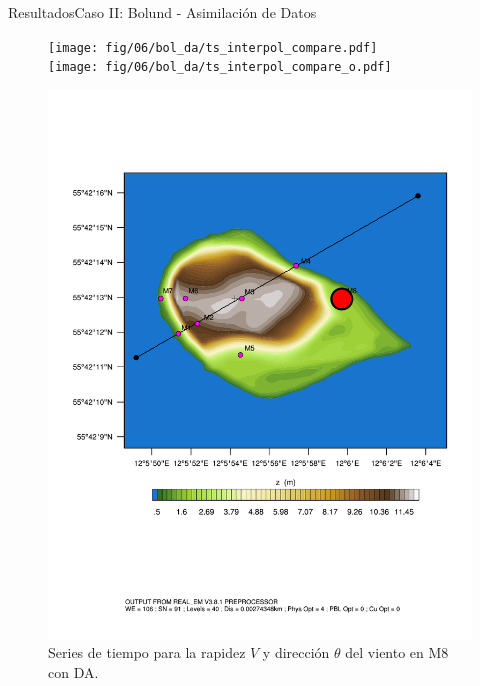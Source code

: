 \documentclass[mathserif,10pt]{beamer}
\begin{document}
\begin{frame}{Resultados}{Caso II: Bolund - Asimilación de Datos}
	\begin{figure}[H]
		\begin{minipage}{0.65\linewidth}
			\texttt{[image: fig/06/bol\_da/ts\_interpol\_compare.pdf]}\\%
			\texttt{[image: fig/06/bol\_da/ts\_interpol\_compare\_o.pdf]}%
		\end{minipage}%
		\begin{minipage}{0.35\linewidth}
			\centering
			\includegraphics[width=1\linewidth,page=1,trim={3.5cm 9.3cm 0.8cm 3.8cm},clip]{fig/05/ppt/bol_control_point8.pdf}%
		\end{minipage}%
		\vspace{-2mm}\caption{Series de tiempo para la rapidez $V$ y dirección $\theta$ del viento en M8 con DA.}
		\label{fig:06_bol_da_ts_m8}
	\end{figure}
\end{frame}
\end{document}
